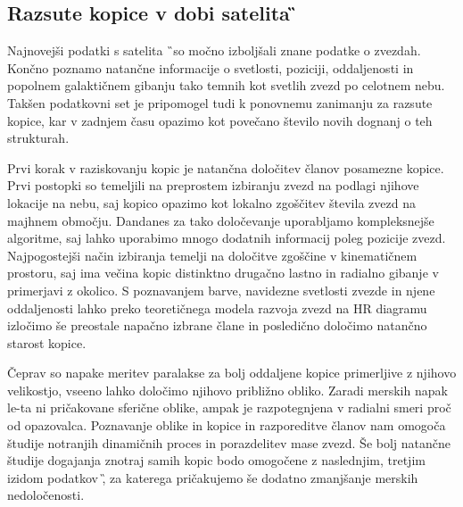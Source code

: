 \subsection{Razsute kopice v dobi satelita \G}
Najnovejši podatki s satelita \G\ so močno izboljšali znane podatke o zvezdah. Končno poznamo natančne informacije o svetlosti, poziciji, oddaljenosti in popolnem galaktičnem gibanju tako temnih kot svetlih zvezd po celotnem nebu. Takšen podatkovni set je pripomogel tudi k ponovnemu zanimanju za razsute kopice, kar v zadnjem času opazimo kot povečano število novih dognanj o teh strukturah.

Prvi korak v raziskovanju kopic je natančna določitev članov posamezne kopice. Prvi postopki so temeljili na preprostem izbiranju zvezd na podlagi njihove lokacije na nebu, saj kopico opazimo kot lokalno zgoščitev števila zvezd na majhnem območju. Dandanes za tako določevanje uporabljamo kompleksnejše algoritme, saj lahko uporabimo mnogo dodatnih informacij poleg pozicije zvezd. Najpogostejši način izbiranja temelji na določitve zgoščine v kinematičnem prostoru, saj ima večina kopic distinktno drugačno lastno in radialno gibanje v primerjavi z okolico. S poznavanjem barve, navidezne svetlosti zvezde in njene oddaljenosti lahko preko teoretičnega modela razvoja zvezd na HR diagramu izločimo še preostale napačno izbrane člane in posledično določimo natančno starost kopice.

Čeprav so napake meritev paralakse za bolj oddaljene kopice primerljive z njihovo velikostjo, vseeno lahko določimo njihovo približno obliko. Zaradi merskih napak le-ta ni pričakovane sferične oblike, ampak je razpotegnjena v radialni smeri proč od opazovalca. Poznavanje oblike in kopice in razporeditve članov nam omogoča študije notranjih dinamičnih proces in porazdelitev mase zvezd. Še bolj natančne študije dogajanja znotraj samih kopic bodo omogočene z naslednjim, tretjim izidom podatkov \G, za katerega pričakujemo še dodatno zmanjšanje merskih nedoločenosti.

